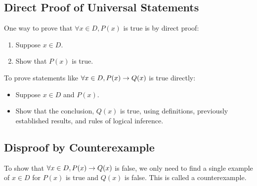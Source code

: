 \documentclass{report}
\begin{document}
\subsection*{Direct Proof of Universal Statements}
One way to prove that $\forall x\in D, P(x)$ is true is by direct proof:
\begin{enumerate}
	\item Suppose $x\in D$.
	\item Show that $P(x)$ is true.
\end{enumerate}
To prove statements like $\forall x\in D, P(x) \rightarrow Q(x)$ is true directly:
\begin{itemize}
	\item Suppose $x\in D$ and $P(x)$.
	\item Show that the conclusion, $Q(x)$ is true, using definitions, previously established results, and rules of logical inference.
\end{itemize}


\subsection*{Disproof by Counterexample}
To show that $\forall x\in D, P(x)\rightarrow Q(x)$ is false, we only need to find a single example of $x\in D$ for $P(x)$ is true and $Q(x)$ is false. This is called a counterexample.
\end{document}
